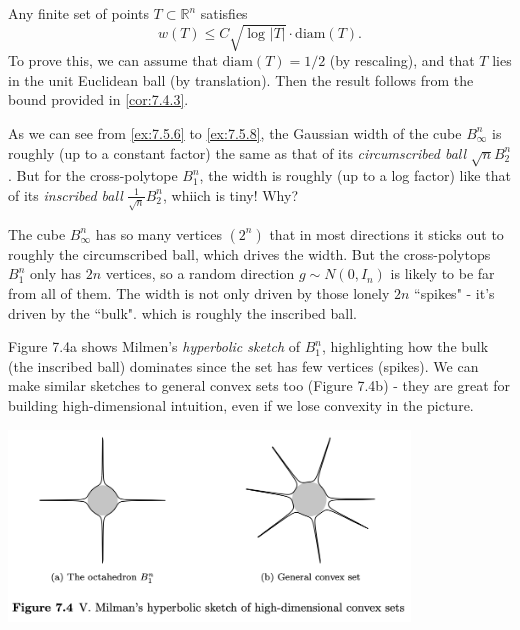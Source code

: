 \begin{example}
\label{ex:7.5.9}
Any finite set of points $T \subset \mathbb{R}^n$ satisfies 
\[ w(T) \leq C \sqrt{\log_{}{|T|}} \cdot \mathrm{diam}(T). \]
To prove this, we can assume that $\mathrm{diam}(T) = 1/2$ (by rescaling), and that $T$ lies in the unit 
Euclidean ball (by translation). Then the result follows from the bound provided in \cref{cor:7.4.3}.
\end{example}

\begin{remark}
\label{rmk:7.5.10}
As we can see from \cref{ex:7.5.6} to \cref{ex:7.5.8}, the Gaussian width of the cube $B_{\infty}^n$ is 
roughly (up to a constant factor) the same as that of its \textit{circumscribed ball} $\sqrt{n}B_2^n$. But 
for the cross-polytope $B_1^n$, the width is roughly (up to a log factor) like that of its \textit{inscribed 
ball} $\frac{1}{\sqrt{n}}B_2^n$, whiich is tiny! Why?

The cube $B_{\infty}^n$ has so many vertices $(2^n)$ that in most directions it sticks out to roughly the 
circumscribed ball, which drives the width. But the cross-polytops $B_1^n$ only has $2n$ vertices, so a random 
direction $g \sim N(0, I_n)$ is likely to be far from all of them. The width is not only driven by those lonely 
$2n$ ``spikes" - it's driven by the ``bulk". which is roughly the inscribed ball.

Figure 7.4a shows Milmen's \textit{hyperbolic sketch} of $B_1^n$, highlighting how the bulk (the inscribed ball) 
dominates since the set has few vertices (spikes). We can make similar sketches to general convex sets too 
(Figure 7.4b) - they are great for building high-dimensional intuition, even if we lose convexity in the picture.

\begin{center}
	\includegraphics[width=0.8\textwidth]{Chapter 7/fig7-4.png}
\end{center}
\end{remark}


